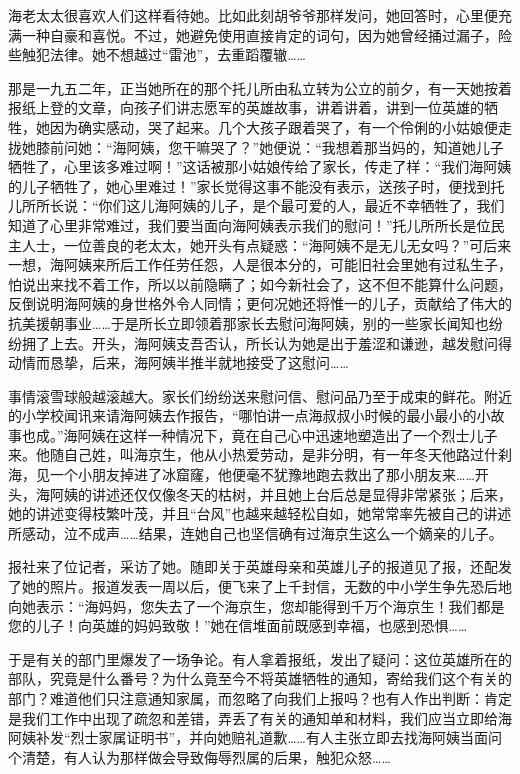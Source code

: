 \par 海老太太很喜欢人们这样看待她。比如此刻胡爷爷那样发问，她回答时，心里便充满一种自豪和喜悦。不过，她避免使用直接肯定的词句，因为她曾经捅过漏子，险些触犯法律。她不想越过“雷池”，去重蹈覆辙……
\par 那是一九五二年，正当她所在的那个托儿所由私立转为公立的前夕，有一天她按着报纸上登的文章，向孩子们讲志愿军的英雄故事，讲着讲着，讲到一位英雄的牺牲，她因为确实感动，哭了起来。几个大孩子跟着哭了，有一个伶俐的小姑娘便走拢她膝前问她：“海阿姨，您干嘛哭了？”她便说：“我想着那当妈的，知道她儿子牺牲了，心里该多难过啊！”这话被那小姑娘传给了家长，传走了样：“我们海阿姨的儿子牺牲了，她心里难过！”家长觉得这事不能没有表示，送孩子时，便找到托儿所所长说：“你们这儿海阿姨的儿子，是个最可爱的人，最近不幸牺牲了，我们知道了心里非常难过，我们要当面向海阿姨表示我们的慰问！”托儿所所长是位民主人士，一位善良的老太太，她开头有点疑惑：“海阿姨不是无儿无女吗？”可后来一想，海阿姨来所后工作任劳任怨，人是很本分的，可能旧社会里她有过私生子，怕说出来找不着工作，所以以前隐瞒了；如今新社会了，这不但不能算什么问题，反倒说明海阿姨的身世格外令人同情；更何况她还将惟一的儿子，贡献给了伟大的抗美援朝事业……于是所长立即领着那家长去慰问海阿姨，别的一些家长闻知也纷纷拥了上去。开头，海阿姨支吾否认，所长认为她是出于羞涩和谦逊，越发慰问得动情而恳挚，后来，海阿姨半推半就地接受了这慰问……
\par 事情滚雪球般越滚越大。家长们纷纷送来慰问信、慰问品乃至于成束的鲜花。附近的小学校闻讯来请海阿姨去作报告，“哪怕讲一点海叔叔小时候的最小最小的小故事也成。”海阿姨在这样一种情况下，竟在自己心中迅速地塑造出了一个烈士儿子来。他随自己姓，叫海京生，他从小热爱劳动，是非分明，有一年冬天他路过什刹海，见一个小朋友掉进了冰窟窿，他便毫不犹豫地跑去救出了那小朋友来……开头，海阿姨的讲述还仅仅像冬天的枯树，并且她上台后总是显得非常紧张；后来，她的讲述变得枝繁叶茂，并且“台风”也越来越轻松自如，她常常率先被自己的讲述所感动，泣不成声……结果，连她自己也坚信确有过海京生这么一个嫡亲的儿子。
\par 报社来了位记者，采访了她。随即关于英雄母亲和英雄儿子的报道见了报，还配发了她的照片。报道发表一周以后，便飞来了上千封信，无数的中小学生争先恐后地向她表示：“海妈妈，您失去了一个海京生，您却能得到千万个海京生！我们都是您的儿子！向英雄的妈妈致敬！”她在信堆面前既感到幸福，也感到恐惧……
\par 于是有关的部门里爆发了一场争论。有人拿着报纸，发出了疑问：这位英雄所在的部队，究竟是什么番号？为什么竟至今不将英雄牺牲的通知，寄给我们这个有关的部门？难道他们只注意通知家属，而忽略了向我们上报吗？也有人作出判断：肯定是我们工作中出现了疏忽和差错，弄丢了有关的通知单和材料，我们应当立即给海阿姨补发“烈士家属证明书”，并向她赔礼道歉……有人主张立即去找海阿姨当面问个清楚，有人认为那样做会导致侮辱烈属的后果，触犯众怒……
